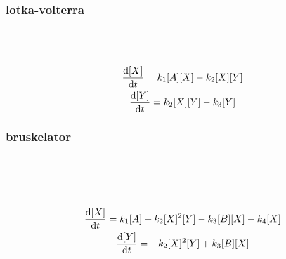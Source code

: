 \documentclass[10pt, a4paper, twoside, onecolumn]{article}
\numberwithin{equation}{section}
\begin{document}
	\subsubsection{lotka-volterra}
	\begin{center}
		 \\
		 \\
	\end{center}
	\begin{gather}
		\dv{[X]}{t}=k_{1}[A][X]-k_{2}[X][Y] \\
		\dv{[Y]}{t}=k_{2}[X][Y]-k_{3}[Y]
	\end{gather}
	\subsubsection{bruskelator}
	\begin{center}
		 \\
		 \\
		 \\
	\end{center}
	\begin{gather}
		\dv{[X]}{t}=k_{1}[A]+k_{2}[X]^{2}[Y]-k_{3}[B][X]-k_{4}[X] \\
		\dv{[Y]}{t}=-k_{2}[X]^{2}[Y]+k_{3}[B][X]
	\end{gather}
\end{document}
